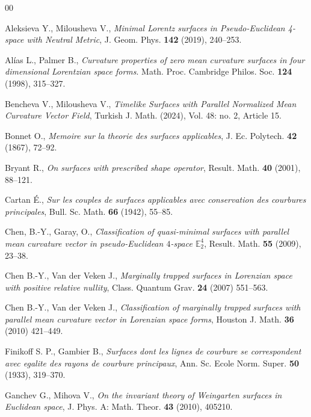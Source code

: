 \documentclass[12pt]{amsart}
\newcommand{\E}{\mathbb E}
\theoremstyle{definition}
\theoremstyle{remark}
\numberwithin{equation}{section}
\begin{document}
\begin{thebibliography}{00}
	
	Aleksieva Y.,  Milousheva V., \textit{Minimal Lorentz surfaces in Pseudo-Euclidean 4-space with Neutral Metric}, J. Geom. Phys. \textbf{142} (2019), 240--253. 
	
	Al\'{i}as L., Palmer B., \textit{Curvature properties of zero mean curvature surfaces in four dimensional Lorentzian space forms}. Math. Proc. Cambridge Philos. Soc. \textbf{124} (1998), 315--327.
	
	Bencheva V., Milousheva V., \textit{Timelike Surfaces with Parallel Normalized Mean Curvature Vector Field}, Turkish J. Math. (2024), Vol. 48: no. 2, Article 15.
	
	Bonnet O., \textit{Memoire sur la theorie des surfaces applicables}, J. Ec. Polytech. \textbf{42} (1867),  72--92.
	
	Bryant R., \textit{On surfaces with prescribed shape operator}, Result. Math. \textbf{40} (2001),  88--121.
	
	Cartan \'E., \textit{Sur les couples de surfaces applicables avec conservation des courbures principales}, Bull. Sc. Math. \textbf{66} (1942),  55--85.
	
	 Chen,  B.-Y.,  Garay, O., \textit{Classification of quasi-minimal surfaces
		with parallel mean curvature vector in pseudo-Euclidean $4$-space
		$\E^4_2$}, Result. Math. \textbf{55} (2009), 23--38.
	
	Chen  B.-Y., Van der Veken J., \textit{Marginally trapped surfaces in Lorenzian space with positive relative nullity}, Class. Quantum Grav. \textbf{24} (2007) 551--563.
	
	Chen  B.-Y., Van der Veken J., \textit{Classification of marginally trapped surfaces with parallel mean curvature vector in Lorenzian space forms}, Houston J. Math. \textbf{36} (2010)
	421--449.
	
	Finikoff S. P., Gambier B., \textit{Surfaces dont les lignes de courbure se correspondent avec egalite des rayons de courbure principaux}, Ann. Sc. Ecole Norm. Super. \textbf{50} (1933), 319--370.
	
	Ganchev G., Mihova V., \textit{On the invariant theory of Weingarten surfaces in Euclidean space}, J. Phys. A: Math. Theor.  \textbf{43} (2010), 405210.
	

\end{thebibliography}
\end{document}
